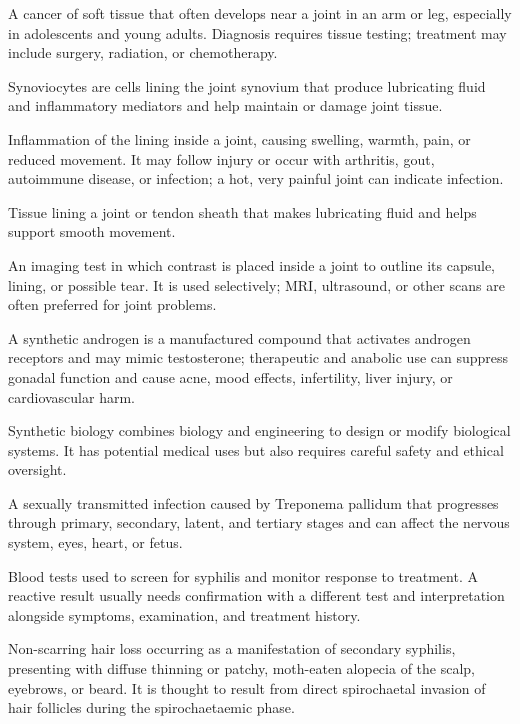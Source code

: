  A cancer of soft tissue that often develops near a joint in an arm or leg, especially in adolescents and young adults. Diagnosis requires tissue testing; treatment may include surgery, radiation, or chemotherapy.

 Synoviocytes are cells lining the joint synovium that produce lubricating fluid and inflammatory mediators and help maintain or damage joint tissue.

 Inflammation of the lining inside a joint, causing swelling, warmth, pain, or reduced movement. It may follow injury or occur with arthritis, gout, autoimmune disease, or infection; a hot, very painful joint can indicate infection.

 Tissue lining a joint or tendon sheath that makes lubricating fluid and helps support smooth movement.

 An imaging test in which contrast is placed inside a joint to outline its capsule, lining, or possible tear. It is used selectively; MRI, ultrasound, or other scans are often preferred for joint problems.

 A synthetic androgen is a manufactured compound that activates androgen receptors and may mimic testosterone; therapeutic and anabolic use can suppress gonadal function and cause acne, mood effects, infertility, liver injury, or cardiovascular harm.

 Synthetic biology combines biology and engineering to design or modify biological systems. It has potential medical uses but also requires careful safety and ethical oversight.

 A sexually transmitted infection caused by Treponema pallidum that progresses through primary, secondary, latent, and tertiary stages and can affect the nervous system, eyes, heart, or fetus.

 Blood tests used to screen for syphilis and monitor response to treatment. A reactive result usually needs confirmation with a different test and interpretation alongside symptoms, examination, and treatment history.

 Non-scarring hair loss occurring as a manifestation of secondary syphilis, presenting
with diffuse thinning or patchy, moth-eaten alopecia of the scalp, eyebrows, or beard.
It is thought to result from direct spirochaetal invasion of hair follicles during the
spirochaetaemic phase.

